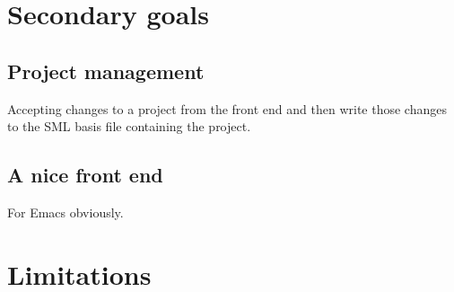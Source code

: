 \documentclass[a4paper,oneside]{article}
\begin{document}
\section{Secondary goals}

\subsection{Project management}
Accepting changes to a project from the front end and then write those changes to the SML basis file
containing the project.

\subsection{A nice front end}
For Emacs obviously.

\section{Limitations}
\end{document}
